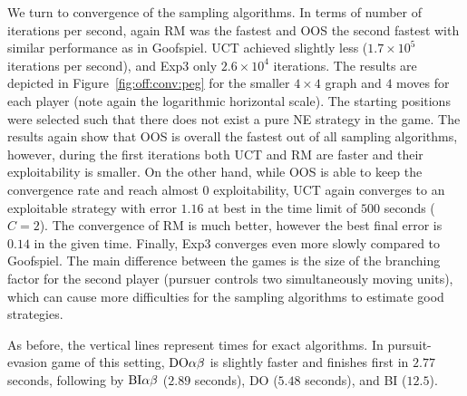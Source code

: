 We turn to convergence of the sampling algorithms.
In terms of number of iterations per second, again RM was the fastest and OOS the second fastest with similar performance as in Goofspiel.
UCT achieved slightly less ($1.7\times10^5$ iterations per second), and Exp3 only $2.6\times10^4$ iterations.
The results are depicted in Figure~\ref{fig:off:conv:peg} for the smaller $4\times4$ graph and $4$ moves for each player (note again the logarithmic horizontal scale).
The starting positions were selected such that there does not exist a pure NE strategy in the game.
The results again show that OOS is overall the fastest out of all sampling algorithms, however, during the first iterations both UCT and RM are faster and their exploitability is smaller. 
On the other hand, while OOS is able to keep the convergence rate and reach almost $0$ exploitability, UCT again converges to an exploitable strategy with error $1.16$ at best in the time limit of $500$ seconds ($C=2$).
The convergence of RM is much better, however the best final error is $0.14$ in the given time.
Finally, Exp3 converges even more slowly compared to Goofspiel.
The main difference between the games is the size of the branching factor for the second player (pursuer controls two simultaneously moving units), which can cause more difficulties for the sampling algorithms to estimate good strategies.

As before, the vertical lines represent times for exact algorithms.
In pursuit-evasion game of this setting, $\textrm{DO}\alpha\beta$ is slightly faster and finishes first in $2.77$ seconds, following by $\textrm{BI}\alpha\beta$ ($2.89$ seconds), \textsc{DO} ($5.48$ seconds), and \textsc{BI} ($12.5$).

